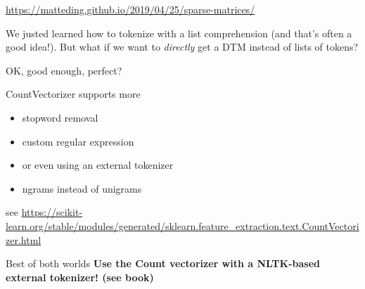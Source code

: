 {
	\begin{frame}
		\url{https://matteding.github.io/2019/04/25/sparse-matrices/}
	\end{frame}
}


\begin{frame}[standout]
We justed learned how to tokenize with a list comprehension (and that's often a good idea!). But what if we want to \emph{directly} get a DTM instead of lists of tokens?
\end{frame}




\begin{frame}{OK, good enough, perfect?}
	\begin{block}{CountVectorizer supports more}
		\begin{itemize}
			\item stopword removal
			\item custom regular expression
			\item or even using an external tokenizer
			\item ngrams instead of unigrams
		\end{itemize}
	\end{block}
	\tiny{see \url{https://scikit-learn.org/stable/modules/generated/sklearn.feature\_extraction.text.CountVectorizer.html}}
	
	\pause
	\begin{alertblock}{Best of both worlds}
		\textbf{Use the Count vectorizer with a NLTK-based external tokenizer! (see book)}
	\end{alertblock}
\end{frame}


